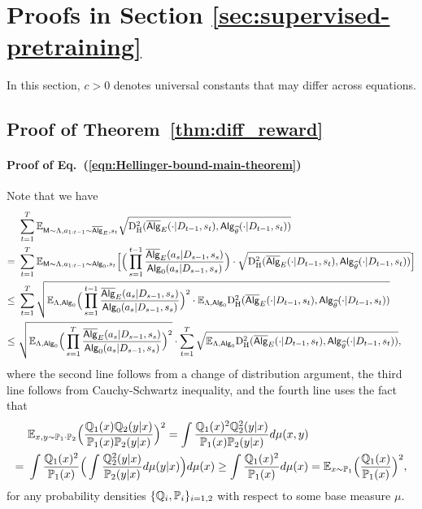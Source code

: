 \section{Proofs in Section \ref{sec:supervised-pretraining}}

In this section, $c>0$ denotes universal constants that may differ across equations. 


\subsection{Proof of Theorem~\ref{thm:diff_reward}}\label{sec:pf_thm:diff_reward}
\paragraph{Proof of Eq.~(\ref{eqn:Hellinger-bound-main-theorem})} Note that we have
\begin{align*}
&~
\sum_{t=1}^{T}\mathbb{E}_{{\mathsf{M}}\sim{\Lambda},{a}_{1:t-1}\sim\overline{\mathsf{Alg}}_{E},{s}_t}\sqrt{{\mathrm{D}^2_{\mathrm{H}}}(\overline{\mathsf{Alg}}_{{E}}(\cdot|{D}_{t-1},{s}_t),{\mathsf{Alg}}_{{\widehat{\theta}}}(\cdot|{D}_{t-1},{s}_t))}\\
=&~
\sum_{t=1}^{T}\mathbb{E}_{{\mathsf{M}}\sim{\Lambda},{a}_{1:t-1}\sim{\mathsf{Alg}}_0,{s}_t} \Big[
\Big(\prod_{s=1}^{t-1}\frac{\overline{\mathsf{Alg}}_{E}({a}_s|{D}_{s-1},{s}_s)}{{\mathsf{Alg}}_0({a}_s|{D}_{s-1},{s}_s)}\Big)
\cdot
\sqrt{{\mathrm{D}^2_{\mathrm{H}}}(\overline{\mathsf{Alg}}_{{E}}(\cdot|{D}_{t-1},{s}_t),{\mathsf{Alg}}_{{\widehat{\theta}}}(\cdot|{D}_{t-1},{s}_t))}\Big] \\
\leq&~
\sum_{t=1}^{T}
\sqrt{\mathbb{E}_{{\Lambda},{\mathsf{Alg}}_0}
\Big(\prod_{s=1}^{t-1}\frac{\overline{\mathsf{Alg}}_{E}({a}_s|{D}_{s-1},{s}_s)}{{\mathsf{Alg}}_0({a}_s|{D}_{s-1},{s}_s)}\Big)^2\cdot\mathbb{E}_{{\Lambda},{\mathsf{Alg}}_0}{\mathrm{D}^2_{\mathrm{H}}}(\overline{\mathsf{Alg}}_{{E}}(\cdot|{D}_{t-1},{s}_t),{\mathsf{Alg}}_{{\widehat{\theta}}}(\cdot|{D}_{t-1},{s}_t))}\\
\leq &~
\sqrt{\mathbb{E}_{{\Lambda},{\mathsf{Alg}}_0}
\Big(\prod_{s=1}^{{T}}\frac{\overline{\mathsf{Alg}}_{E}({a}_s|{D}_{s-1},{s}_s)}{{\mathsf{Alg}}_0({a}_s|{D}_{s-1},{s}_s)}\Big)^2}
\cdot
\sum_{t=1}^{T}\sqrt{\mathbb{E}_{{\Lambda},{\mathsf{Alg}}_0}{\mathrm{D}^2_{\mathrm{H}}}(\overline{\mathsf{Alg}}_{{E}}(\cdot|{D}_{t-1},{s}_t),{\mathsf{Alg}}_{{\widehat{\theta}}}(\cdot|{D}_{t-1},{s}_t))},\end{align*}
where the second  line follows from a change of distribution argument, the third line follows from Cauchy-Schwartz inequality,  and the fourth line uses the fact that
\begin{align*}
&~\mathbb{E}_{x,y\sim\mathbb{P}_1\cdot\mathbb{P}_2}\Big(\frac{\mathbb{Q}_1(x)\mathbb{Q}_2(y|x)}{\mathbb{P}_1(x)\mathbb{P}_2(y|x)}\Big)^2
    =
    \int\frac{\mathbb{Q}_1(x)^2\mathbb{Q}_2^2(y|x)}{\mathbb{P}_1(x)\mathbb{P}_2(y|x)}d\mu(x,y)\\
    =&~
    \int\frac{\mathbb{Q}_1(x)^2}{\mathbb{P}_1(x)}\Big(\int\frac{\mathbb{Q}_2^2(y|x)}{\mathbb{P}_2(y|x)}d\mu(y|x)\Big)d\mu(x)
    \geq  
    \int\frac{\mathbb{Q}_1(x)^2}{\mathbb{P}_1(x)}d\mu(x)= \mathbb{E}_{x\sim\mathbb{P}_1}\Big(\frac{\mathbb{Q}_1(x)}{\mathbb{P}_1(x)}\Big)^2,
\end{align*}
for any probability densities $\{ \mathbb{Q}_i,\mathbb{P}_i \}_{i=1,2}$ with respect to some base measure $\mu$. 

